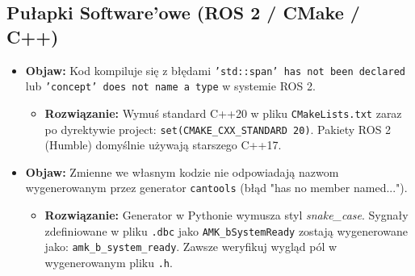 \documentclass[a4paper,11pt]{article}
\begin{document}
\vspace{1em}

\begin{ros2box}
\subsection*{Pułapki Software'owe (ROS 2 / CMake / C++)}
\begin{itemize}
    \item \textbf{Objaw:} Kod kompiluje się z błędami \texttt{'std::span' has not been declared} lub \texttt{'concept' does not name a type} w systemie ROS 2.
    \begin{itemize}
        \item \textbf{Rozwiązanie:} Wymuś standard C++20 w pliku \texttt{CMakeLists.txt} zaraz po dyrektywie project: \texttt{set(CMAKE\_CXX\_STANDARD 20)}. Pakiety ROS 2 (Humble) domyślnie używają starszego C++17.
    \end{itemize}
    \item \textbf{Objaw:} Zmienne we własnym kodzie nie odpowiadają nazwom wygenerowanym przez generator \texttt{cantools} (błąd "has no member named...").
    \begin{itemize}
        \item \textbf{Rozwiązanie:} Generator w Pythonie wymusza styl \textit{snake\_case}. Sygnały zdefiniowane w pliku \texttt{.dbc} jako \texttt{AMK\_bSystemReady} zostają wygenerowane jako: \texttt{amk\_b\_system\_ready}. Zawsze weryfikuj wygląd pól w wygenerowanym pliku \texttt{.h}.
    \end{itemize}
\end{itemize}
\end{ros2box}
\end{document}
